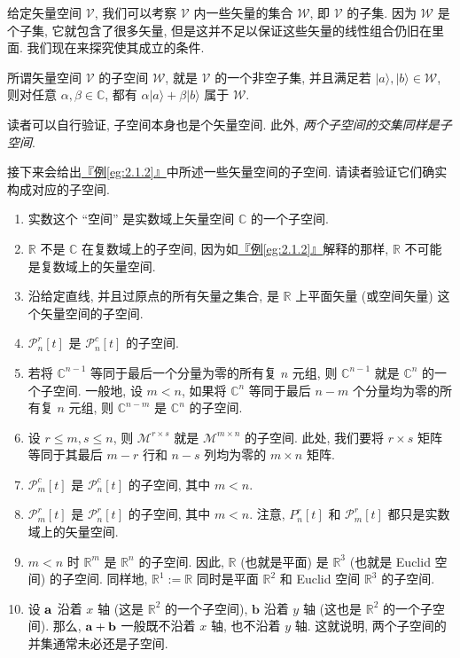 \documentclass[lang=cn,zihao=-4,twoside,fontset=none]{textbook}
\newcommand{\lt}{<}
\newcommand{\egref}[1]{\hyperref[#1]{『例\textnormal{\ref*{#1}}』}}
\renewcommand{\ket}[1]{| #1 \rangle}
\begin{document}
给定矢量空间 $\mathcal V$, 我们可以考察 $\mathcal V$ 内一些矢量的集合 $\mathcal W$, 即 $\mathcal V$ 的子集. 因为 $\mathcal W$ 是个子集, 它就包含了很多矢量, 但是这并不足以保证这些矢量的线性组合仍旧在里面. 我们现在来探究使其成立的条件. 

\begin{defi}[子空间]\label{def:2.1.4}
    所谓矢量空间 $\mathcal V$ 的子空间 $\mathcal W$, 就是 $\mathcal V$ 的一个非空子集, 并且满足若 $\ket{a},\ket{b}\in\mathcal W$, 则对任意 $\alpha,\beta\in\mathbb C$,  都有  $\alpha\ket{a}+\beta\ket{b}$ 属于 $\mathcal W$.
\end{defi}


读者可以自行验证, 子空间本身也是个矢量空间. 此外, \textit{两个子空间的交集同样是子空间}.

\begin{exam}\label{eg:2.1.5}
    接下来会给出\egref{eg:2.1.2}中所述一些矢量空间的子空间. 请读者验证它们确实构成对应的子空间.
    \begin{enumerate}[label=\textnormal{(\arabic*)}]
        \item 实数这个 “空间” 是实数域上矢量空间 $\mathbb C$ 的一个子空间.
        \item  $\mathbb R$ 不是 $\mathbb C$ 在复数域上的子空间, 因为如\egref{eg:2.1.2}解释的那样, $\mathbb R$ 不可能是复数域上的矢量空间. 
        \item 沿给定直线, 并且过原点的所有矢量之集合, 是 $\mathbb R$ 上平面矢量 (或空间矢量) 这个矢量空间的子空间.
        \item $\mathcal P^r_n[t]$ 是 $\mathcal P^c_n[t]$ 的子空间.
        \item 若将 $\mathbb C^{n-1}$ 等同于最后一个分量为零的所有复 $n$ 元组, 则 $\mathbb C^{n-1}$ 就是 $\mathbb C^n$ 的一个子空间. 一般地, 设 $m\lt n$, 如果将 $\mathbb C^{n}$ 等同于最后 $n-m$ 个分量均为零的所有复 $n$ 元组, 则 $\mathbb C^{n-m}$ 是 $\mathbb C^n$ 的子空间.
        \item 设 $r\leq m,s\leq n$, 则 $\mathcal M^{r\times s}$ 就是 $\mathcal M^{m\times n}$ 的子空间. 此处, 我们要将 $r\times s$ 矩阵等同于其最后 $m-r$ 行和 $n-s$ 列均为零的 $m\times n$ 矩阵. 
        \item  $\mathcal P_m^c[t]$ 是 $\mathcal P^c_n[t]$ 的子空间, 其中 $m\lt n$.
        \item $\mathcal P_m^r[t]$ 是 $\mathcal P_n^r[t]$ 的子空间, 其中 $m\lt n$. 注意, $P_n^r[t]$ 和 $\mathcal P_m^r[t]$ 都只是实数域上的矢量空间. 
        \item  $m\lt n$ 时 $\mathbb R^m$ 是 $\mathbb R^n$ 的子空间. 因此, $\mathbb R$ (也就是平面) 是 $\mathbb R^3$ (也就是 Euclid 空间) 的子空间. 同样地, $\mathbb R^1:=\mathbb R$ 同时是平面 $\mathbb R^2$ 和 Euclid 空间 $\mathbb R^3$ 的子空间.
        \item 设 ${\mathbf a}$ 沿着 $x$ 轴 (这是 $\mathbb R^2$ 的一个子空间), $\mathbf b$ 沿着 $y$ 轴 (这也是 $\mathbb R^2$ 的一个子空间). 那么, ${\mathbf a}+{\mathbf b}$ 一般既不沿着 $x$ 轴, 也不沿着 $y$ 轴. 这就说明, 两个子空间的并集通常未必还是子空间.    
    \end{enumerate}
\end{exam}
\end{document}
